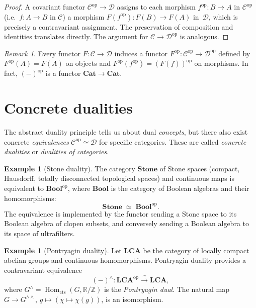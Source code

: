 \documentclass[a4paper,12pt]{book}
\DeclareMathOperator{\Hom}{Hom}
\newcommand{\Cat}{\mathbf{Cat}}
\newcommand{\op}{\mathrm{op}}
\newcommand{\Z}{\mathbb{Z}}
\newcommand{\R}{\mathbb{R}}
\theoremstyle{definition}
\newtheorem{example}[definition]{Example}
\theoremstyle{plain}
\theoremstyle{remark}
\newtheorem{remark}[definition]{Remark}
\begin{document}
\begin{proof}
A covariant functor $\mathcal{C}^{\op}\to\mathcal{D}$ assigns to each
morphism $f^{\op}\colon B\to A$ in $\mathcal{C}^{\op}$ (i.e.\
$f\colon A\to B$ in $\mathcal{C}$) a morphism
$F(f^{\op})\colon F(B)\to F(A)$ in~$\mathcal{D}$,
which is precisely a contravariant assignment.
The preservation of composition and identities translates
directly.  The argument for $\mathcal{C}\to\mathcal{D}^{\op}$ is
analogous.
\end{proof}

\begin{remark}\label{rem:op-functor}
Every functor $F\colon\mathcal{C}\to\mathcal{D}$ induces a functor
$F^{\op}\colon\mathcal{C}^{\op}\to\mathcal{D}^{\op}$ defined by
$F^{\op}(A)=F(A)$ on objects and $F^{\op}(f^{\op})=(F(f))^{\op}$ on
morphisms.  In fact, $(-)^{\op}$ is a functor $\Cat\to\Cat$.
\end{remark}


\section{Concrete dualities}\label{sec:concrete-dualities}


The abstract duality principle tells us about dual \emph{concepts}, but
there also exist concrete \emph{equivalences}
$\mathcal{C}^{\op}\simeq\mathcal{D}$ for specific categories.  These are
called \emph{concrete dualities} or \emph{dualities of categories}.

\begin{example}[Stone duality]\label{ex:stone-duality}
The category $\mathbf{Stone}$ of Stone spaces (compact, Hausdorff,
totally disconnected topological spaces) and continuous maps is
equivalent to $\mathbf{Bool}^{\op}$, where $\mathbf{Bool}$ is the
category of Boolean algebras and their homomorphisms:
\[
    \mathbf{Stone} \;\simeq\; \mathbf{Bool}^{\op}.
\]
The equivalence is implemented by the functor sending a Stone space to
its Boolean algebra of clopen subsets, and conversely sending a
Boolean algebra to its space of ultrafilters.
\end{example}

\begin{example}[Pontryagin duality]\label{ex:pontryagin-duality}
\index{Pontryagin duality}
Let $\mathbf{LCA}$ be the category of locally compact abelian groups
and continuous homomorphisms.  Pontryagin duality provides a
contravariant equivalence
\[
    (-)^\wedge\colon\mathbf{LCA}^{\op}
    \xrightarrow{\;\sim\;}\mathbf{LCA},
\]
where $G^\wedge = \Hom_{\mathrm{cts}}(G,\R/\Z)$ is the
\emph{Pontryagin dual}.
The natural map $G\to G^{\wedge\wedge}$, $g\mapsto(\chi\mapsto\chi(g))$,
is an isomorphism.
\end{example}
\end{document}
